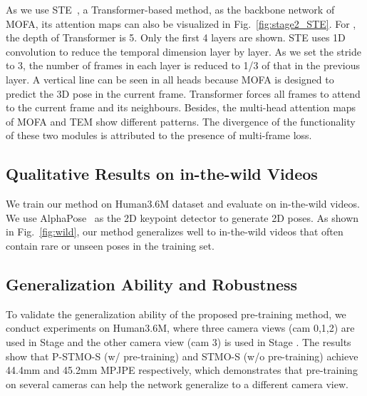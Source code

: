 \documentclass[]{llncs}
\newcommand{\RNum}[1]{\uppercase\expandafter{\romannumeral #1\relax}}
\begin{document}
As we use STE~\cite{li2022exploiting}, a Transformer-based method, as the backbone network of MOFA, its attention maps can also be visualized in Fig.~\ref{fig:stage2_STE}. For , the depth of Transformer is 5. Only the first 4 layers are shown. STE uses 1D convolution to reduce the temporal dimension layer by layer. As we set the stride to 3, the number of frames in each layer is reduced to 1/3 of that in the previous layer. A vertical line can be seen in all heads because MOFA is designed to predict the 3D pose in the current frame. Transformer forces all frames to attend to the current frame and its neighbours. Besides, the multi-head attention maps of MOFA and TEM show different patterns. The divergence of the functionality of these two modules is attributed to the presence of multi-frame loss.

\subsection{Qualitative Results on in-the-wild Videos}
We train our method on Human3.6M dataset and evaluate on in-the-wild videos. We use AlphaPose~\cite{fang2017rmpe} as the 2D keypoint detector to generate 2D poses. As shown in Fig.~\ref{fig:wild}, our method generalizes well to in-the-wild videos that often contain rare or unseen poses in the training set. 

\begin{table}[t]
\begin{center}
\caption{Analysis on the robustness in terms of MPJPE. \ddag: w/o pre-training. RS: random shuffle.}
\vspace{-0cm}
\label{tab:noise}
\end{center}
\vspace{-0.4cm}
\end{table}

\subsection{Generalization Ability and Robustness}
To validate the generalization ability of the proposed pre-training method, we conduct experiments on Human3.6M, where three camera views (cam 0,1,2) are used in Stage \RNum{1} and the other camera view (cam 3) is used in Stage \RNum{2}. The results show that P-STMO-S (w/ pre-training) and STMO-S (w/o pre-training) achieve 44.4mm and 45.2mm MPJPE respectively, which demonstrates that pre-training on several cameras can help the network generalize to a different camera view.
\end{document}
